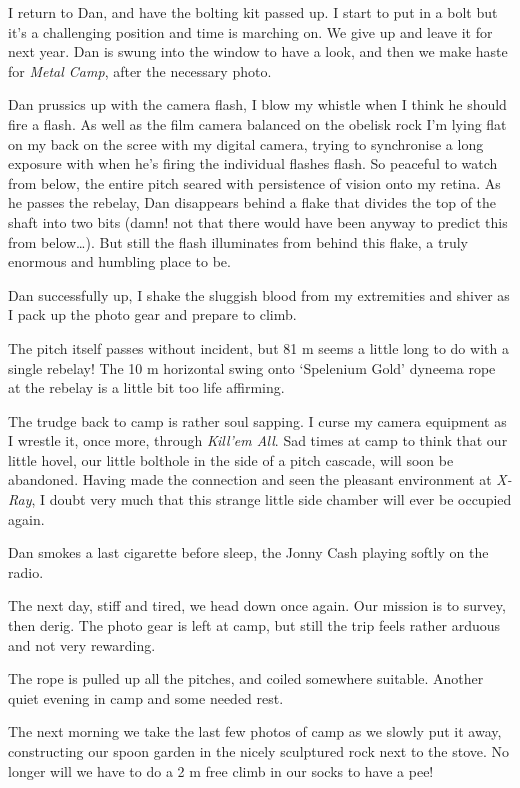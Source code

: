 I return to Dan, and have the bolting kit passed up. I start to put in a
bolt but it's a challenging position and time is marching on. We give up
and leave it for next year. Dan is swung into the window to have a look,
and then we make haste for \emph{Metal Camp}, after the necessary photo.

Dan prussics up with the camera flash, I blow my whistle when I think he
should fire a flash. As well as the film camera balanced on the obelisk
rock I'm lying flat on my back on the scree with my digital camera,
trying to synchronise a long exposure with when he's firing the
individual flashes flash. So peaceful to watch from below, the entire
pitch seared with persistence of vision onto my retina. As he passes the
rebelay, Dan disappears behind a flake that divides the top of the shaft
into two bits (damn! not that there would have been anyway to predict
this from below\ldots{}). But still the flash illuminates from behind
this flake, a truly enormous and humbling place to be.

Dan successfully up, I shake the sluggish blood from my extremities and
shiver as I pack up the photo gear and prepare to climb.

The pitch itself passes without incident, but 81 m seems a little long
to do with a single rebelay! The 10 m horizontal swing onto `Spelenium
Gold' dyneema rope at the rebelay is a little bit too life affirming.

The trudge back to camp is rather soul sapping. I curse my camera
equipment as I wrestle it, once more, through \emph{Kill'em All}. Sad
times at camp to think that our little hovel, our little bolthole in the
side of a pitch cascade, will soon be abandoned. Having made the
connection and seen the pleasant environment at \emph{X-Ray}, I doubt
very much that this strange little side chamber will ever be occupied
again.

Dan smokes a last cigarette before sleep, the Jonny Cash playing softly
on the radio.

The next day, stiff and tired, we head down once again. Our mission is
to survey, then derig. The photo gear is left at camp, but still the
trip feels rather arduous and not very rewarding.

The rope is pulled up all the pitches, and coiled somewhere suitable.
Another quiet evening in camp and some needed rest.

The next morning we take the last few photos of camp as we slowly put it
away, constructing our spoon garden in the nicely sculptured rock next
to the stove. No longer will we have to do a 2 m free climb in our socks
to have a pee!

